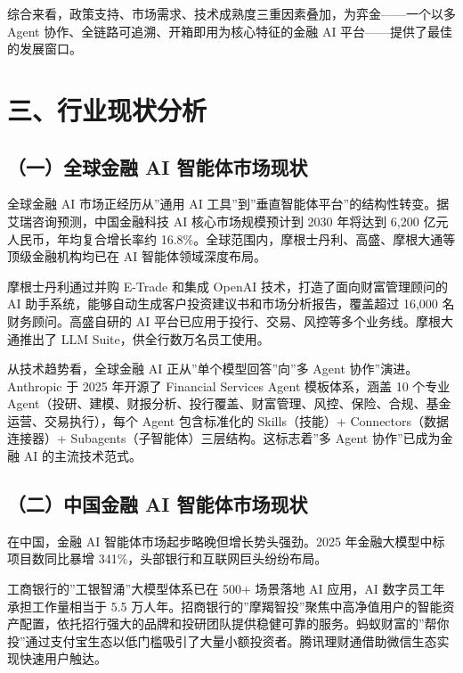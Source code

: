 \documentclass[
]{ctexart}
\begin{document}
综合来看，政策支持、市场需求、技术成熟度三重因素叠加，为弈金------一个以多
Agent 协作、全链路可追溯、开箱即用为核心特征的金融 AI
平台------提供了最佳的发展窗口。

\section{三、行业现状分析}\label{ux4e09ux884cux4e1aux73b0ux72b6ux5206ux6790}

\subsection{（一）全球金融 AI
智能体市场现状}\label{ux4e00ux5168ux7403ux91d1ux878d-ai-ux667aux80fdux4f53ux5e02ux573aux73b0ux72b6}

全球金融 AI 市场正经历从''通用 AI
工具''到''垂直智能体平台''的结构性转变。据艾瑞咨询预测，中国金融科技 AI
核心市场规模预计到 2030 年将达到 6,200 亿元人民币，年均复合增长率约
16.8\%。全球范围内，摩根士丹利、高盛、摩根大通等顶级金融机构均已在 AI
智能体领域深度布局。

摩根士丹利通过并购 E-Trade 和集成 OpenAI 技术，打造了面向财富管理顾问的
AI 助手系统，能够自动生成客户投资建议书和市场分析报告，覆盖超过 16,000
名财务顾问。高盛自研的 AI
平台已应用于投行、交易、风控等多个业务线。摩根大通推出了 LLM
Suite，供全行数万名员工使用。

从技术趋势看，全球金融 AI 正从''单个模型回答''向''多 Agent
协作''演进。Anthropic 于 2025 年开源了 Financial Services Agent
模板体系，涵盖 10 个专业
Agent（投研、建模、财报分析、投行覆盖、财富管理、风控、保险、合规、基金运营、交易执行），每个
Agent 包含标准化的 Skills（技能）+ Connectors（数据连接器）+
Subagents（子智能体）三层结构。这标志着''多 Agent 协作''已成为金融 AI
的主流技术范式。

\subsection{（二）中国金融 AI
智能体市场现状}\label{ux4e8cux4e2dux56fdux91d1ux878d-ai-ux667aux80fdux4f53ux5e02ux573aux73b0ux72b6}

在中国，金融 AI 智能体市场起步略晚但增长势头强劲。2025
年金融大模型中标项目数同比暴增 341\%，头部银行和互联网巨头纷纷布局。

工商银行的''工银智涌''大模型体系已在 500+ 场景落地 AI 应用，AI
数字员工年承担工作量相当于 5.5
万人年。招商银行的''摩羯智投''聚焦中高净值用户的智能资产配置，依托招行强大的品牌和投研团队提供稳健可靠的服务。蚂蚁财富的''帮你投''通过支付宝生态以低门槛吸引了大量小额投资者。腾讯理财通借助微信生态实现快速用户触达。
\end{document}
